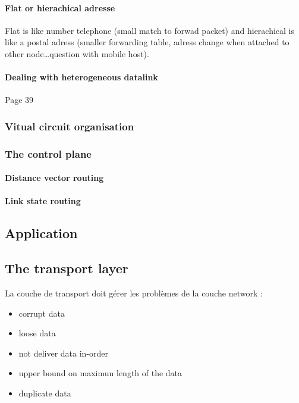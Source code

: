 \paragraph{Flat or hierachical adresse}
Flat is like number telephone (small match to forwad packet) and hierachical is like a postal adress (smaller forwarding table, adress change when attached to other node\ldots question with mobile host).

\paragraph{Dealing with heterogeneous datalink}
Page 39

\subsubsection{Vitual circuit organisation}

\subsubsection{The control plane}

\paragraph{Distance vector routing}

\paragraph{Link state routing}

\subsection{Application}


\subsection{The transport layer}

La couche de transport doit gérer les problèmes de la couche network :
\begin{itemize}
    \item corrupt data
    \item loose data
    \item not deliver data in-order
    \item upper bound on maximun length of the data
    \item duplicate data
\end{itemize}

